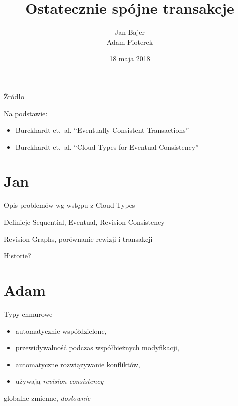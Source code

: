 \documentclass{beamer}
\title{Ostatecznie spójne transakcje}
\date{18 maja 2018}
\author{Jan Bajer\\Adam Pioterek}
\begin{document}
\begin{frame}
\titlepage{}
\end{frame}

\begin{frame}{Źródło}
    \begin{card}
        Na podstawie:
        \begin{itemize}
            \item Burckhardt et.\ al. “Eventually Consistent Transactions”
            \item Burckhardt et.\ al. “Cloud Types for Eventual Consistency”
        \end{itemize}
    \end{card}
\end{frame}

\section{Jan}

\begin{frame}{Opis problemów wg wstępu z Cloud Types}
\end{frame}

\begin{frame}{Definicje Sequential, Eventual, Revision Consistency}
\end{frame}

\begin{frame}{Revision Graphs, porównanie rewizji i transakcji}
\end{frame}

\begin{frame}{Historie?}
\end{frame}

\section{Adam}

\begin{frame}[fragile]{Typy chmurowe}
    \begin{card}
        \begin{itemize}[<+->]
            \item automatycznie współdzielone,
            \item przewidywalność podczas współbieżnych modyfikacji,
            \item automatyczne rozwiązywanie konfliktów,
            \item używają \textit{revision consistency}
        \end{itemize}
    \end{card}
     {
        \begin{card}
            globalne zmienne, \textit{dosłownie}
        \end{card}
    }
\end{frame}
\end{document}
